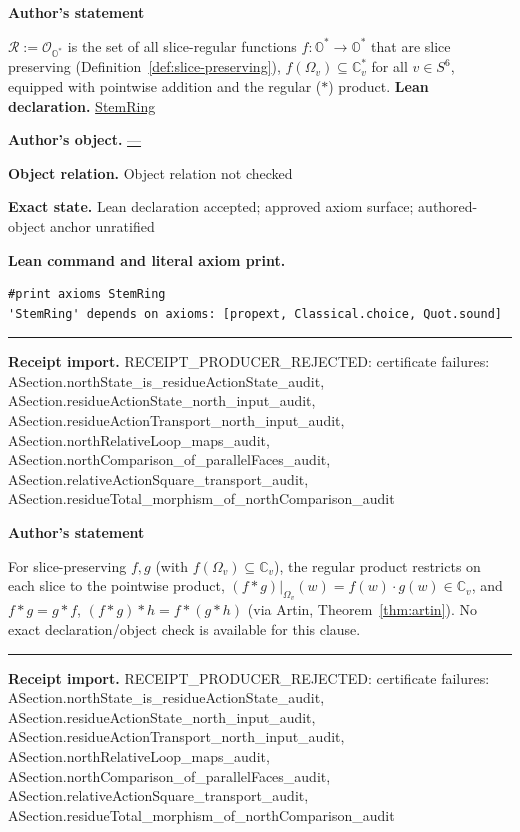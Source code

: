 \documentclass[11pt]{article}
\newcommand{\OO}{\mathbb{O}}
\newcommand{\CC}{\mathbb{C}}
\newcommand{\Ostar}{\OO^{*}}
\theoremstyle{plain}
\theoremstyle{definition}
\theoremstyle{remark}
\begin{document}
\begin{tcolorbox}[provenancecard,title={19. Definition - The ring of slice-preserving functions under the regular product},title after break={19. Definition - The ring of slice-preserving functions under the regular product (continued)}]
\textbf{Author's statement}\par
$\mathcal R:=\mathcal O_{\Ostar}$ is the set of all slice-regular functions
$f:\Ostar\to\Ostar$ that are slice preserving (Definition~\ref{def:slice-preserving}),
$f(\Omega_v)\subseteq\CC_v^{*}$ for all $v\in S^6$, equipped with pointwise addition and
the regular ($\ast$) product.
\tcblower
\textbf{Lean declaration.} \url{StemRing}
\par\textbf{Author's object.} \url{—}
\par\textbf{Object relation.} Object relation not checked
\par\textbf{Exact state.} Lean declaration accepted; approved axiom surface; authored-object anchor unratified
\par\smallskip\textbf{Lean command and literal axiom print.}
\begin{Verbatim}[breaklines=true,breakanywhere=true,fontsize=\small]
#print axioms StemRing
'StemRing' depends on axioms: [propext, Classical.choice, Quot.sound]
\end{Verbatim}
\medskip\hrule\medskip
\textbf{Receipt import.} \textcolor{KgtRed}{RECEIPT\_PRODUCER\_REJECTED: certificate failures: ASection.northState\_is\_residueActionState\_audit, ASection.residueActionState\_north\_input\_audit, ASection.residueActionTransport\_north\_input\_audit, ASection.northRelativeLoop\_maps\_audit, ASection.northComparison\_of\_parallelFaces\_audit, ASection.relativeActionSquare\_transport\_audit, ASection.residueTotal\_morphism\_of\_northComparison\_audit}
\end{tcolorbox}
\medskip
\begin{tcolorbox}[provenancecard,title={20. Theorem - Regular product on slice-preserving functions; \{\textbackslash{}cite[Rem.\textasciitilde{}2.11]\{Wang\}\}},title after break={20. Theorem - Regular product on slice-preserving functions; \{\textbackslash{}cite[Rem.\textasciitilde{}2.11]\{Wang\}\} (continued)}]
\textbf{Author's statement}\par
For slice-preserving $f,g$ (with $f(\Omega_v)\subseteq\CC_v$), the regular product
restricts on each slice to the pointwise product, $(f\ast g)|_{\Omega_v}(w)=f(w)\cdot
g(w)\in\CC_v$, and $f\ast g=g\ast f$, $(f\ast g)\ast h=f\ast(g\ast h)$ (via Artin,
Theorem~\ref{thm:artin}).
\tcblower
\textcolor{KgtRed}{No exact declaration/object check is available for this clause.}
\medskip\hrule\medskip
\textbf{Receipt import.} \textcolor{KgtRed}{RECEIPT\_PRODUCER\_REJECTED: certificate failures: ASection.northState\_is\_residueActionState\_audit, ASection.residueActionState\_north\_input\_audit, ASection.residueActionTransport\_north\_input\_audit, ASection.northRelativeLoop\_maps\_audit, ASection.northComparison\_of\_parallelFaces\_audit, ASection.relativeActionSquare\_transport\_audit, ASection.residueTotal\_morphism\_of\_northComparison\_audit}
\end{tcolorbox}
\end{document}

